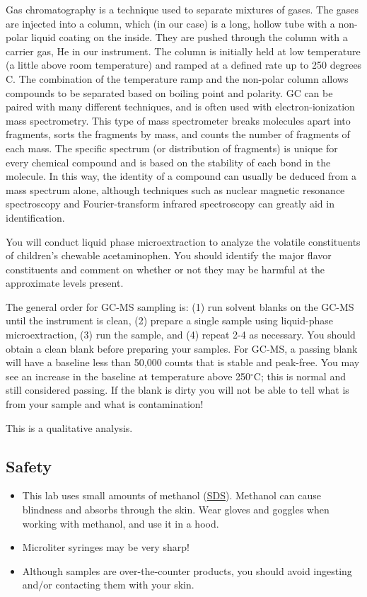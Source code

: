 \documentclass[]{tufte-book}
\providecommand{\tightlist}{%
  \setlength{\itemsep}{0pt}\setlength{\parskip}{0pt}}
\begin{document}
Gas chromatography is a technique used to separate mixtures of gases. The gases are injected into a column, which (in our case) is a long, hollow tube with a non-polar liquid coating on the inside. They are pushed through the column with a carrier gas, He in our instrument. The column is initially held at low temperature (a little above room temperature) and ramped at a defined rate up to 250 degrees C. The combination of the temperature ramp and the non-polar column allows compounds to be separated based on boiling point and polarity. GC can be paired with many different techniques, and is often used with electron-ionization mass spectrometry. This type of mass spectrometer breaks molecules apart into fragments, sorts the fragments by mass, and counts the number of fragments of each mass. The specific spectrum (or distribution of fragments) is unique for every chemical compound and is based on the stability of each bond in the molecule. In this way, the identity of a compound can usually be deduced from a mass spectrum alone, although techniques such as nuclear magnetic resonance spectroscopy and Fourier-transform infrared spectroscopy can greatly aid in identification.

You will conduct liquid phase microextraction to analyze the volatile constituents of children's chewable acetaminophen. You should identify the major flavor constituents and comment on whether or not they may be harmful at the approximate levels present.

The general order for GC-MS sampling is: (1) run solvent blanks on the GC-MS until the instrument is clean, (2) prepare a single sample using liquid-phase microextraction, (3) run the sample, and (4) repeat 2-4 as necessary. You should obtain a clean blank before preparing your samples. For GC-MS, a passing blank will have a baseline less than 50,000 counts that is stable and peak-free. You may see an increase in the baseline at temperature above 250\(^{\circ}\)C; this is normal and still considered passing. If the blank is dirty you will not be able to tell what is from your sample and what is contamination!

This is a qualitative analysis.

\hypertarget{safety-2}{%
\subsection*{Safety}\label{safety-2}}

\begin{itemize}
\tightlist
\item
  This lab uses small amounts of methanol (\href{http://www.sciencelab.com/msds.php?msdsId=9927227}{SDS}). Methanol can cause blindness and absorbs through the skin. Wear gloves and goggles when working with methanol, and use it in a hood.\\
\item
  Microliter syringes may be very sharp!\\
\item
  Although samples are over-the-counter products, you should avoid ingesting and/or contacting them with your skin.
\end{itemize}
\end{document}
